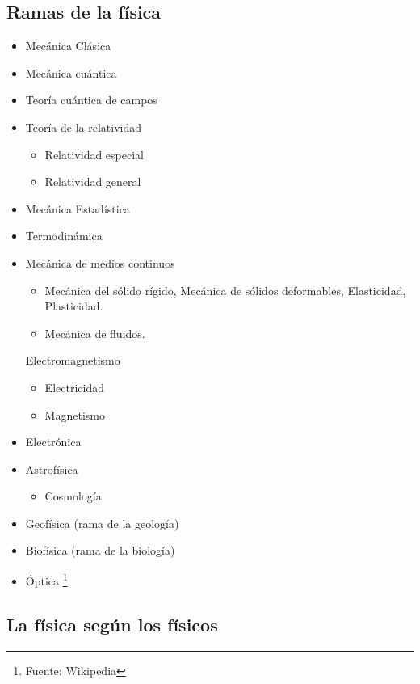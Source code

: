 \subsection{Ramas de la física} 
\begin{itemize}
	\item Mecánica Clásica 
	\item Mecánica cuántica
	\item Teoría cuántica de campos 
	\item Teoría de la relatividad 
	\begin{itemize}
	\item Relatividad especial  
	\item Relatividad general 
     \end{itemize}
\item Mecánica Estadística 
\item Termodinámica
\item Mecánica de medios continuos 
\begin{itemize}
	\item Mecánica del sólido rígido, Mecánica de sólidos deformables, Elasticidad, Plasticidad.
	\item Mecánica de fluidos. 
\end{itemize}
Electromagnetismo 
\begin{itemize}
	\item Electricidad 
	\item Magnetismo 
\end{itemize}
\item Electrónica 
\item Astrofísica 
	\begin{itemize} \item Cosmología \end{itemize}
\item Geofísica (rama de la geología) 
\item Biofísica (rama de la biología) 
\item Óptica \footnote{Fuente: Wikipedia}
\end{itemize}


\subsection{La física según los físicos}


